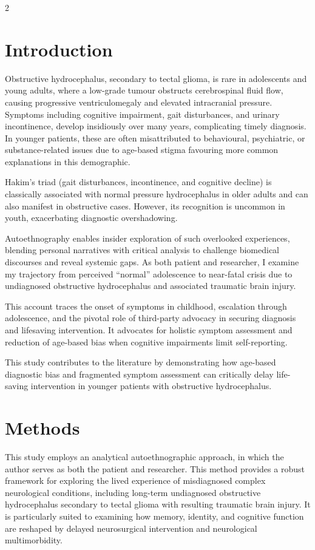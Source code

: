 \documentclass{article}
\begin{document}
\begin{multicols}{2}
\section*{Introduction}
Obstructive hydrocephalus, secondary to tectal glioma, is rare in adolescents and young adults, where a low-grade tumour obstructs cerebrospinal fluid flow, causing progressive ventriculomegaly and elevated intracranial pressure. Symptoms including cognitive impairment, gait disturbances, and urinary incontinence, develop insidiously over many years, complicating timely diagnosis. In younger patients, these are often misattributed to behavioural, psychiatric, or substance-related issues due to age-based stigma favouring more common explanations in this demographic.

Hakim’s triad (gait disturbances, incontinence, and cognitive decline) is classically associated with normal pressure hydrocephalus in older adults and can also manifest in obstructive cases. However, its recognition is uncommon in youth, exacerbating diagnostic overshadowing.

Autoethnography enables insider exploration of such overlooked experiences, blending personal narratives with critical analysis to challenge biomedical discourses and reveal systemic gaps. As both patient and researcher\cite{anderson2006, ellis2011}, I examine my trajectory from perceived “normal” adolescence to near-fatal crisis due to undiagnosed obstructive hydrocephalus and associated traumatic brain injury.

This account traces the onset of symptoms in childhood, escalation through adolescence, and the pivotal role of third-party advocacy in securing diagnosis and lifesaving intervention. It advocates for holistic symptom assessment and reduction of age-based bias when cognitive impairments limit self-reporting.

This study contributes to the literature by demonstrating how age-based diagnostic bias and fragmented symptom assessment can critically delay life-saving intervention in younger patients with obstructive hydrocephalus.

\section*{Methods}
This study employs an analytical autoethnographic approach, in which the author serves as both the patient and researcher. This method provides a robust framework for exploring the lived experience of misdiagnosed complex neurological conditions, including long-term undiagnosed obstructive hydrocephalus secondary to tectal glioma with resulting traumatic brain injury.  It is particularly suited to examining how memory, identity, and cognitive function are reshaped by delayed neurosurgical intervention and neurological multimorbidity\cite{anderson2006,ellis2011}.


\end{multicols}
\end{document}
